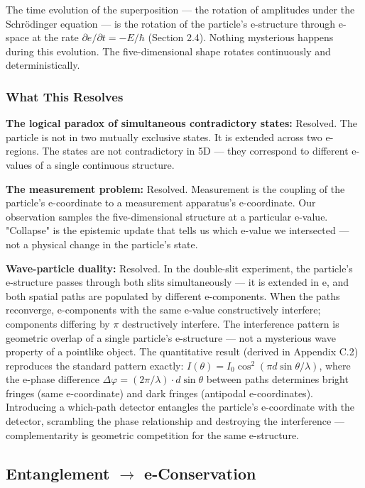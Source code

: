 \documentclass[aps,prd,preprint,superscriptaddress,longbibliography,floatfix]{revtex4-2}
\theoremstyle{remark}
\begin{document}
The time evolution of the superposition --- the rotation of amplitudes under the Schr\"{o}dinger equation --- is the rotation of the particle's e-structure through e-space at the rate $\partial e/\partial t = -E/\hbar$ (Section 2.4). Nothing mysterious happens during this evolution. The five-dimensional shape rotates continuously and deterministically.


\subsubsection{What This Resolves}

\textbf{The logical paradox of simultaneous contradictory states:} Resolved. The particle is not in two mutually exclusive states. It is extended across two e-regions. The states are not contradictory in 5D --- they correspond to different e-values of a single continuous structure.

\textbf{The measurement problem:} Resolved. Measurement is the coupling of the particle's e-coordinate to a measurement apparatus's e-coordinate. Our observation samples the five-dimensional structure at a particular e-value. "Collapse" is the epistemic update that tells us which e-value we intersected --- not a physical change in the particle's state.

\textbf{Wave-particle duality:} Resolved. In the double-slit experiment, the particle's e-structure passes through both slits simultaneously --- it is extended in e, and both spatial paths are populated by different e-components. When the paths reconverge, e-components with the same e-value constructively interfere; components differing by $\pi$ destructively interfere. The interference pattern is geometric overlap of a single particle's e-structure --- not a mysterious wave property of a pointlike object. The quantitative result (derived in Appendix C.2) reproduces the standard pattern exactly: $I(\theta) = I_{0} \cos^{2}(\pi d \sin \theta/\lambda)$, where the e-phase difference $\Delta\varphi = (2\pi/\lambda)\cdot d \sin \theta$ between paths determines bright fringes (same e-coordinate) and dark fringes (antipodal e-coordinates). Introducing a which-path detector entangles the particle's e-coordinate with the detector, scrambling the phase relationship and destroying the interference --- complementarity is geometric competition for the same e-structure.



\subsection{Entanglement $\to$ e-Conservation}
\end{document}
